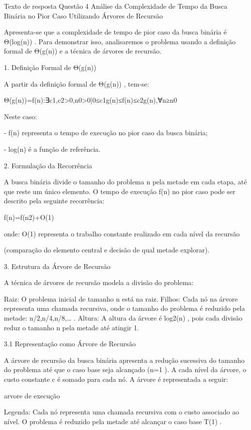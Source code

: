 Texto de resposta Questão 4
Análise da Complexidade de Tempo da Busca Binária no Pior Caso Utilizando Árvores de Recursão

Apresenta-se que a complexidade de tempo de pior caso da busca binária é Θ(log(n))
 . Para demonstrar isso, analisaremos o problema usando a definição formal de Θ(g(n))
 e a técnica de árvores de recursão.



1. Definição Formal de Θ(g(n))

A partir da definição formal de Θ(g(n))
, tem-se:

Θ(g(n))={f(n):∃c1,c2>0,n0>0|0≤c1g(n)≤f(n)≤c2g(n),∀n≥n0}


Neste caso:

- f(n)
 representa o tempo de execução no pior caso da busca binária;

- log(n)
 é a função de referência.



2. Formulação da Recorrência

A busca binária divide o tamanho do problema n
 pela metade em cada etapa, até que reste um único elemento. O tempo de execução f(n)
 no pior caso pode ser descrito pela seguinte recorrência:

f(n)=f(n2)+O(1)


onde: O(1)
 representa o trabalho constante realizado em cada nível da recursão

(comparação do elemento central e decisão de qual metade explorar).



3. Estrutura da Árvore de Recursão

A técnica de árvores de recursão modela a divisão do problema:

    Raiz: O problema inicial de tamanho n
 está na raiz.
    Filhos: Cada nó na árvore representa uma chamada recursiva, onde o tamanho do problema é reduzido pela metade: n/2,n/4,n/8,…
.
    Altura: A altura da árvore é log2(n)
 , pois cada divisão reduz o tamanho n
 pela metade até atingir 1.


3.1 Representação como Árvore de Recursão

A árvore de recursão da busca binária apresenta a redução sucessiva do tamanho do problema até que o caso base seja alcançado (n=1
). A cada nível da árvore, o custo constante c
 é somado para cada nó. A árvore é representada a seguir:

arvore de execução

Legenda: Cada nó representa uma chamada recursiva com o custo associado ao nível. O problema é reduzido pela metade até alcançar o caso base T(1)
.



